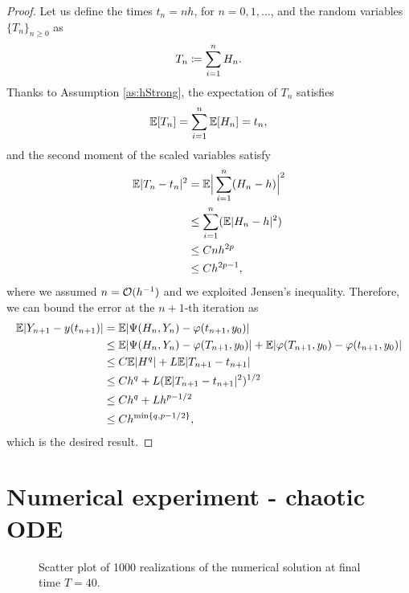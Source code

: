 \documentclass{scrartcl}
\begin{document}
\begin{proof} Let us define the times $t_n = nh$, for $n = 0, 1, \ldots$, and the random variables $\{T_n\}_{n\geq 0}$ as
	\begin{equation}
		T_n \coloneqq \sum_{i=1}^{n} H_n.
	\end{equation}
	Thanks to Assumption \ref{as:hStrong}, the expectation of $T_n$ satisfies
	\begin{equation}
		\mathbb{E}[T_n] = \sum_{i=1}^{n}\mathbb{E}[H_n] = t_n,
	\end{equation} 
	and the second moment of the scaled variables satisfy
	\begin{equation}
	\begin{aligned}
		\mathbb{E}|T_n - t_n|^2 &= \mathbb{E}\Big|\sum_{i=1}^{n}(H_n - h)\Big|^2 \\
		&\leq \sum_{i = 1}^{n}(\mathbb{E}|H_n - h|^2) \\
		&\leq Cnh^{2p} \\
		&\leq Ch^{2p-1}, 
	\end{aligned} 
	\end{equation}
	where we assumed $n = \mathcal{O}(h^{-1})$ and we exploited Jensen's inequality. Therefore, we can bound the error at the $n+1$-th iteration as
	\begin{equation}
	\begin{aligned}
		\mathbb{E}|Y_{n+1} - y(t_{n+1})| &= \mathbb{E}|\Psi(H_n, Y_n) - \varphi(t_{n+1},y_0)|\\
		&\leq \mathbb{E}|\Psi(H_n, Y_n) - \varphi(T_{n+1}, y_0)| + \mathbb{E}|\varphi(T_{n+1}, y_0) - \varphi(t_{n+1},y_0)| \\
		&\leq C\mathbb{E}|H^q|+ L\mathbb{E}|T_{n+1} - t_{n+1}|\\
		&\leq Ch^q + L(\mathbb{E}|T_{n+1} - t_{n+1}|^2)^{1/2}\\
		&\leq Ch^q + Lh^{p - 1/2}\\
		&\leq Ch^{\min\{q, p-1/2\}},
	\end{aligned}
	\end{equation}
	which is the desired result.
\end{proof}

\section{Numerical experiment - chaotic ODE}

\begin{figure}[t]
	\centering
	\resizebox{0.6\linewidth}{!}{}
	\caption{Scatter plot of 1000 realizations of the numerical solution at final time $T=40$.}
	\label{fig:ScatterLorenz}
\end{figure}
\end{document}
